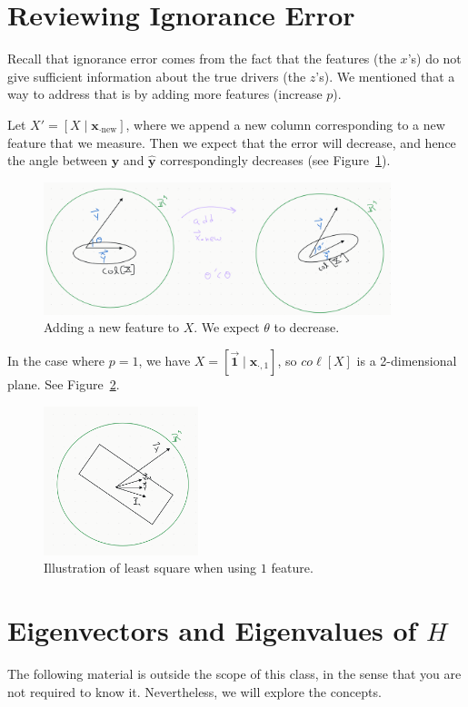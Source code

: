 \documentclass[12pt, a4paper]{article}
\theoremstyle{definition}
\begin{document}
	\section*{Reviewing Ignorance Error}
	Recall that ignorance error comes from the fact that the features (the $x$'s) do not give
	sufficient information about the true drivers (the $z$'s). We mentioned that a way to
	address that is by adding more features (increase $p$).
	
	Let $X'=[X \mid \mathbf{x}_{\cdot \text{new}}]$, where we append a new column
	corresponding to a new feature that we measure. Then we expect that the error
	will decrease, and hence the angle between $\mathbf{y}$ and $\hat{\mathbf{y}}$
	correspondingly decreases (see Figure~\ref{fig:add-new-feature}).
	\begin{figure}
		\centering
		\includegraphics[width=0.9\textwidth]{adding-new-feature}
		\caption{Adding a new feature to $X$. We expect $\theta$ to decrease.}
		\label{fig:add-new-feature}
	\end{figure}
	In the case where $p=1$, we have $X=[\vec{\mathbf{1}} \mid \mathbf{x}_{\cdot, 1}]$,
	so $co\ell[X]$ is a 2-dimensional plane. See Figure~\ref{fig:one-feature}.
	\begin{figure}
		\centering
		\includegraphics[width=0.4\textwidth]{one-feature}
		\caption{Illustration of least square when using $1$ feature.}
		\label{fig:one-feature}
	\end{figure}
	\section*{Eigenvectors and Eigenvalues of $H$}
	The following material is outside the scope of this class, in the sense that you are not
	required to know it. Nevertheless, we will explore the concepts.
	
\end{document}
